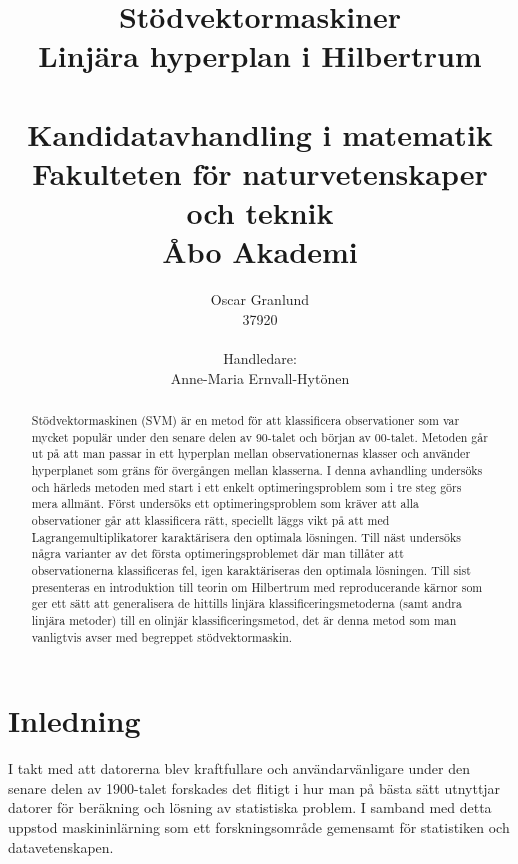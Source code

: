 \documentclass[a4paper, 12pt]{report}
\title{{\Huge Stödvektormaskiner}\\
{\Large Linjära hyperplan i Hilbertrum}\\
~\\
{\large Kandidatavhandling i matematik}\\
{\large Fakulteten för naturvetenskaper och teknik}\\
{\large Åbo Akademi}}
\author{{\Large Oscar Granlund}\\
{\Large37920}\\
\\
{\large Handledare:}\\{\large Anne-Maria Ernvall-Hytönen}}
\theoremstyle{definition}
\theoremstyle{remark}
\newcommand{\bfx}{\mathbf{x}}
\newcommand{\bfy}{\mathbf{y}}
\begin{document}
\maketitle

\begin{abstract}
	Stödvektormaskinen (SVM) är en metod för att klassificera observationer som var mycket populär under den senare delen av 90-talet och början av 00-talet.
	Metoden går ut på att man passar in ett hyperplan mellan observationernas klasser och använder hyperplanet som gräns för övergången mellan klasserna.
	I denna avhandling undersöks och härleds metoden med start i ett enkelt optimeringsproblem som i tre steg görs mera allmänt.
	Först undersöks ett optimeringsproblem som kräver att alla observationer går att klassificera rätt, speciellt läggs vikt på att med Lagrangemultiplikatorer karaktärisera den optimala lösningen.
	Till näst undersöks några varianter av det första optimeringsproblemet där man tillåter att observationerna klassificeras fel, igen karaktäriseras den optimala lösningen.
	Till sist presenteras en introduktion till teorin om Hilbertrum med reproducerande kärnor som ger ett sätt att generalisera de hittills linjära klassificeringsmetoderna (samt andra linjära metoder) till en olinjär klassificeringsmetod, det är denna metod som man vanligtvis avser med begreppet stödvektormaskin.
\end{abstract}

\tableofcontents

\chapter{Inledning}
I takt med att datorerna blev kraftfullare och användarvänligare under den senare delen av 1900-talet forskades det flitigt i hur man på bästa sätt utnyttjar datorer för beräkning och lösning av statistiska problem.
I samband med detta uppstod maskininlärning som ett forskningsområde gemensamt för statistiken och datavetenskapen.
\end{document}
